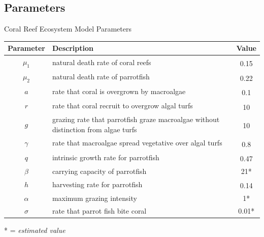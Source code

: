 \documentclass{beamer}
\begin{document}
\subsection{Parameters}
\begin{frame}{Coral Reef Ecosystem Model Parameters}
    \begin{table}
    \centering
    \begin{tabular}{c p{7cm} c}
        \hline
        Parameter & Description & Value  \\
        \hline
        \hline
        $\mu_{1}$ & natural death rate of coral reefs & 0.15\textsuperscript{\cite{16_wolanski_richmond_mccook_2004}}\\
        $\mu_{2}$ & natural death rate of parrotfish & 0.22\textsuperscript{\cite{12_noaa_report}}\\
        $a$ & rate that coral is overgrown by macroalgae & 0.1\textsuperscript{\cite{11_zikkah_anggriani_supriatna_2020}}\\ %
        $r$ & rate that coral recruit to overgrow algal turfs & 10 \textsuperscript{\cite{16_wolanski_richmond_mccook_2004}}\\
        $g$ & grazing rate that parrotfish graze macroalgae without distinction from algae turfs & 10 \textsuperscript{\cite{16_wolanski_richmond_mccook_2004}}\\
        $\gamma$ & rate that macroalgae spread vegetative over algal turfs & 0.8\textsuperscript{\cite{11_zikkah_anggriani_supriatna_2020}}\\ %
        $q$ & intrinsic growth rate for parrotfish & 0.47\textsuperscript{\cite{12_noaa_report}}\\
        $\beta$ & carrying capacity of parrotfish & 21*\\ %
        $h$ & harvesting rate for parrotfish & 0.14 \textsuperscript{\cite{12_noaa_report}}\\
        $\alpha$ & maximum grazing intensity & 1*\\ %
        $\sigma$ & rate that parrot fish bite coral & 0.01*\\ %
        \hline
    \end{tabular}
\end{table}
* = \textit{estimated value}
\end{frame}
\end{document}

